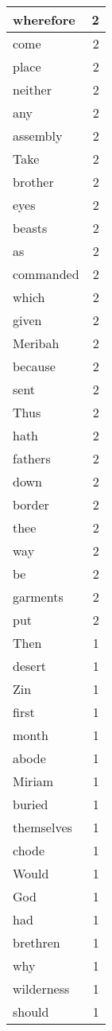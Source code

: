 \begin{center}
\begin{longtable}{l|r}
wherefore & 2 \\ \hline
come & 2 \\ \hline
place & 2 \\ \hline
neither & 2 \\ \hline
any & 2 \\ \hline
assembly & 2 \\ \hline
Take & 2 \\ \hline
brother & 2 \\ \hline
eyes & 2 \\ \hline
beasts & 2 \\ \hline
as & 2 \\ \hline
commanded & 2 \\ \hline
which & 2 \\ \hline
given & 2 \\ \hline
Meribah & 2 \\ \hline
because & 2 \\ \hline
sent & 2 \\ \hline
Thus & 2 \\ \hline
hath & 2 \\ \hline
fathers & 2 \\ \hline
down & 2 \\ \hline
border & 2 \\ \hline
thee & 2 \\ \hline
way & 2 \\ \hline
be & 2 \\ \hline
garments & 2 \\ \hline
put & 2 \\ \hline
Then & 1 \\ \hline
desert & 1 \\ \hline
Zin & 1 \\ \hline
first & 1 \\ \hline
month & 1 \\ \hline
abode & 1 \\ \hline
Miriam & 1 \\ \hline
buried & 1 \\ \hline
themselves & 1 \\ \hline
chode & 1 \\ \hline
Would & 1 \\ \hline
God & 1 \\ \hline
had & 1 \\ \hline
brethren & 1 \\ \hline
why & 1 \\ \hline
wilderness & 1 \\ \hline
should & 1 \\ \hline

\end{longtable}
\end{center}
